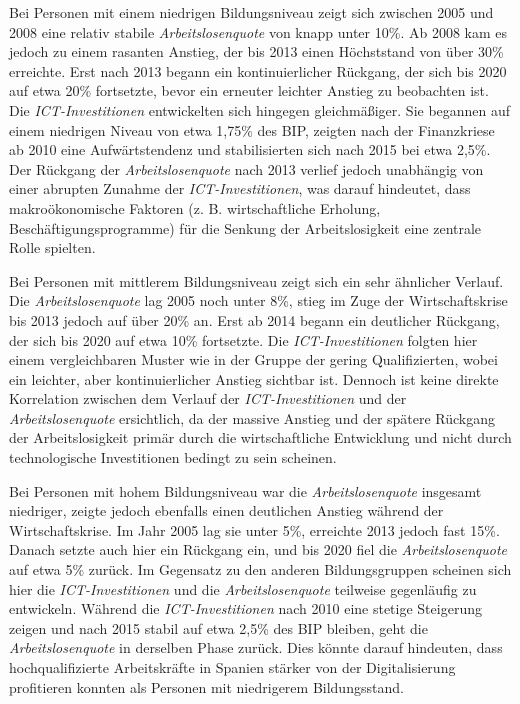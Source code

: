Bei Personen mit einem niedrigen Bildungsniveau zeigt sich zwischen 2005 und 2008 
eine relativ stabile \textit{Arbeitslosenquote} von knapp unter 10\%. Ab 2008 kam es 
jedoch zu einem rasanten Anstieg, der bis 2013 einen Höchststand von über 30\% erreichte. 
Erst nach 2013 begann ein kontinuierlicher Rückgang, der sich bis 2020 auf etwa 20\% 
fortsetzte, bevor ein erneuter leichter Anstieg zu beobachten ist. Die 
\textit{\ac{ICT}-Investitionen} entwickelten sich hingegen gleichmäßiger. Sie begannen 
auf einem niedrigen Niveau von etwa 1,75\% des BIP, zeigten nach der Finanzkriese ab 
2010 eine Aufwärtstendenz und stabilisierten sich nach 2015 bei etwa 2,5\%. Der 
Rückgang der \textit{Arbeitslosenquote} nach 2013 verlief jedoch unabhängig von einer 
abrupten Zunahme der \textit{\ac{ICT}-Investitionen}, was darauf hindeutet, dass 
makroökonomische Faktoren (z. B. wirtschaftliche Erholung, Beschäftigungsprogramme) 
für die Senkung der Arbeitslosigkeit eine zentrale Rolle spielten.

Bei Personen mit mittlerem Bildungsniveau zeigt sich ein sehr ähnlicher Verlauf. Die 
\textit{Arbeitslosenquote} lag 2005 noch unter 8\%, stieg im Zuge der Wirtschaftskrise 
bis 2013 jedoch auf über 20\% an. Erst ab 2014 begann ein deutlicher Rückgang, der sich bis 
2020 auf etwa 10\% fortsetzte. Die \textit{\ac{ICT}-Investitionen} folgten hier einem 
vergleichbaren Muster wie in der Gruppe der gering Qualifizierten, wobei ein leichter, 
aber kontinuierlicher Anstieg sichtbar ist. Dennoch ist keine direkte Korrelation 
zwischen dem Verlauf der \textit{\ac{ICT}-Investitionen} und der \textit{Arbeitslosenquote}  
ersichtlich, da der massive Anstieg und der spätere Rückgang der Arbeitslosigkeit 
primär durch die wirtschaftliche Entwicklung und nicht durch technologische 
Investitionen bedingt zu sein scheinen.

Bei Personen mit hohem Bildungsniveau war die \textit{Arbeitslosenquote} insgesamt 
niedriger, zeigte jedoch ebenfalls einen deutlichen Anstieg während der Wirtschaftskrise. 
Im Jahr 2005 lag sie unter 5\%, erreichte 2013 jedoch fast 15\%. Danach setzte auch hier 
ein Rückgang ein, und bis 2020 fiel die \textit{Arbeitslosenquote} auf etwa 5\% zurück. Im 
Gegensatz zu den anderen Bildungsgruppen scheinen sich hier die 
\textit{\ac{ICT}-Investitionen} und die \textit{Arbeitslosenquote} teilweise gegenläufig zu 
entwickeln. Während die \textit{\ac{ICT}-Investitionen} nach 2010 eine stetige Steigerung 
zeigen und nach 2015 stabil auf etwa 2,5\% des BIP bleiben, geht die 
\textit{Arbeitslosenquote} in derselben Phase zurück. Dies könnte darauf hindeuten, dass 
hochqualifizierte Arbeitskräfte in Spanien stärker von der Digitalisierung profitieren 
konnten als Personen mit niedrigerem Bildungsstand.

